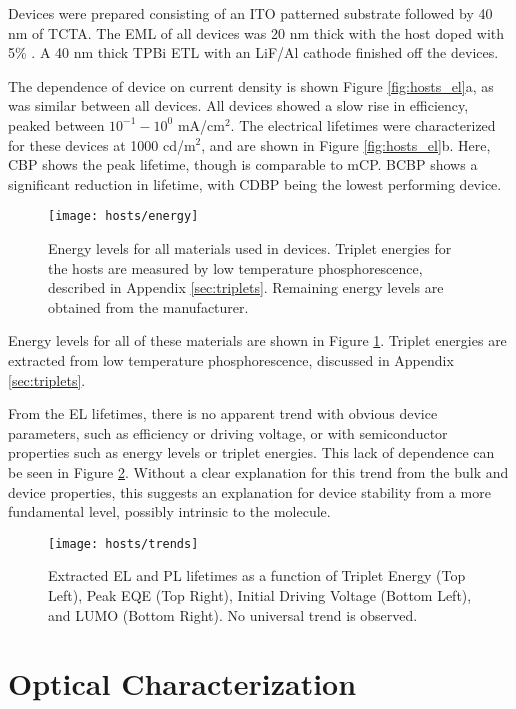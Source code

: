 \documentclass[../thesis.tex]{subfiles}
\begin{document}
Devices were prepared consisting of an ITO patterned substrate followed by 40 nm of TCTA.
The EML of all devices was 20 nm thick with the host doped with 5\% \irppy.
A 40 nm thick TPBi ETL with an LiF/Al cathode finished off the devices.

The dependence of device \eqe on current density is shown Figure \ref{fig:hosts_el}a, as was similar between all devices.  
All devices showed a slow rise in efficiency, peaked between $10^{-1}-10^0$ mA/cm$^2$.
The electrical lifetimes were characterized for these devices at 1000 cd/m$^2$, and are shown in Figure \ref{fig:hosts_el}b.
Here, CBP shows the peak lifetime, though is comparable to mCP.
BCBP shows a significant reduction in lifetime, with CDBP being the lowest performing device.


\begin{figure}[ht]
\centering
\texttt{[image: hosts/energy]}
\caption{Energy levels for all materials used in devices.  Triplet energies for the hosts are measured by low temperature phosphorescence, described in Appendix \ref{sec:triplets}. Remaining energy levels are obtained from the manufacturer.}
\label{fig:hosts_energy}
\end{figure}

Energy levels for all of these materials are shown in Figure \ref{fig:hosts_energy}.
Triplet energies are extracted from low temperature phosphorescence, discussed in Appendix \ref{sec:triplets}.

From the EL lifetimes, there is no apparent trend with obvious device parameters, such as efficiency or driving voltage, or with semiconductor properties such as energy levels or triplet energies.
This lack of dependence can be seen in Figure \ref{fig:hosts_trends}.
Without a clear explanation for this trend from the bulk and device properties, this suggests an explanation for device stability from a more fundamental level, possibly intrinsic to the molecule.

\begin{figure}[ht]
\centering
\texttt{[image: hosts/trends]}
\caption{Extracted EL and PL lifetimes as a function of Triplet Energy (Top Left), Peak EQE (Top Right), Initial Driving Voltage (Bottom Left), and LUMO (Bottom Right). No universal trend is observed.}
\label{fig:hosts_trends}
\end{figure}


\section{Optical Characterization}
\end{document}
